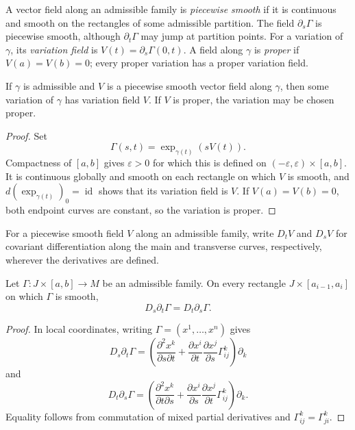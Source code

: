 A vector field along an admissible family is \emph{piecewise smooth} if it is
continuous and smooth on the rectangles of some admissible partition.
The field $\partial_s\Gamma$ is piecewise smooth, although
$\partial_t\Gamma$ may jump at partition points.  For a variation of
$\gamma$, its \emph{variation field} is
$V(t)=\partial_s\Gamma(0,t)$.  A field along $\gamma$ is \emph{proper} if
$V(a)=V(b)=0$; every proper variation has a proper variation field.

\begin{lemma}
\label{lem:variation-field-existence}

If $\gamma$ is admissible and $V$ is a piecewise smooth vector field along
$\gamma$, then some variation of $\gamma$ has variation field $V$.  If $V$ is
proper, the variation may be chosen proper.
\end{lemma}

\begin{proof}
\sketch
Set
\[
\Gamma(s,t)=\exp_{\gamma(t)}(sV(t)).
\]
Compactness of $[a,b]$ gives $\varepsilon>0$ for which this is defined on
$(-\varepsilon,\varepsilon)\times[a,b]$.  It is continuous globally and
smooth on each rectangle on which $V$ is smooth, and
$d(\exp_{\gamma(t)})_0=\operatorname{id}$ shows that its variation field is
$V$.  If $V(a)=V(b)=0$, both endpoint curves are constant, so the variation
is proper.
\end{proof}

For a piecewise smooth field $V$ along an admissible family, write $D_tV$ and
$D_sV$ for covariant differentiation along the main and transverse curves,
respectively, wherever the derivatives are defined.

\begin{lemma}
\label{lem:symmetry-lemma}

Let $\Gamma:J\times[a,b]\to M$ be an admissible family.  On every rectangle
$J\times[a_{i-1},a_i]$ on which $\Gamma$ is smooth,
\[
D_s\partial_t\Gamma=D_t\partial_s\Gamma.
\]
\end{lemma}

\begin{proof}
\sketch
In local coordinates, writing $\Gamma=(x^1,\ldots,x^n)$ gives
\[
D_s\partial_t\Gamma
=\left(\frac{\partial^2x^k}{\partial s\partial t}
+\frac{\partial x^i}{\partial t}\frac{\partial x^j}{\partial s}
\Gamma^k_{ij}\right)\partial_k
\]
and
\[
D_t\partial_s\Gamma
=\left(\frac{\partial^2x^k}{\partial t\partial s}
+\frac{\partial x^i}{\partial s}\frac{\partial x^j}{\partial t}
\Gamma^k_{ij}\right)\partial_k.
\]
Equality follows from commutation of mixed partial derivatives and
$\Gamma^k_{ij}=\Gamma^k_{ji}$.
\end{proof}

